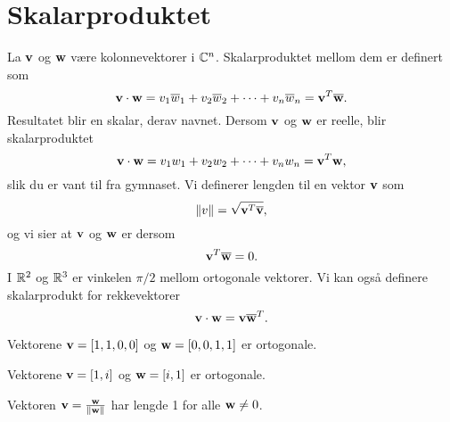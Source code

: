

\label{ch:projeksjon}
\section*{Skalarproduktet}
La $\mathbf{v}$ og $\mathbf{w}$ være kolonnevektorer i $\mathbb{C}^n$. 
Skalarproduktet mellom dem er definert som
\[
 \mathbf{v}\cdot  \mathbf{w} = v_1\overline w_1 + v_2\overline w_2 + \cdots +v_n\overline w_n=\mathbf{v}^T \overline{ \mathbf{w}}.
 \] 
Resultatet blir en skalar, derav navnet. 
Dersom $\mathbf{v}$ og $\mathbf{w}$ er reelle, blir skalarproduktet 
\[
 \mathbf{v}\cdot  \mathbf{w} = v_1w_1 + v_2w_2 + \cdots +v_nw_n=\mathbf{v}^T\mathbf{w},
 \] 
 slik du er vant til fra gymnaset.
 Vi definerer lengden til en vektor $\mathbf{v}$ som 
 \[
 \|v\|=\sqrt{\mathbf{v}^T\overline{\mathbf{v}}},
 \]
 og vi sier at $\mathbf{v}$ og $\mathbf{w}$ er  dersom 
\[
 \mathbf{v}^T  \overline{\mathbf{w}} = 0.
 \]
I $\mathbb{R}^2$ og $\mathbb{R}^3$ er vinkelen $\pi/2$ mellom ortogonale vektorer. 
Vi kan også definere skalarprodukt for rekkevektorer
 \[
 \mathbf{v}\cdot  \mathbf{w} =\mathbf{v}\overline{\mathbf{w}}^T.
 \] 

 \begin{ex}
 Vektorene $\mathbf{v}=[1,1,0,0]$ og $\mathbf{w}=[0,0,1,1]$ er ortogonale. 
 \end{ex}

 \begin{ex}
 Vektorene $\mathbf{v}=[1,i]$ og $\mathbf{w}=[i,1]$ er ortogonale. 
 \end{ex}

 \begin{ex}
 Vektoren $\mathbf{v}=\frac{\mathbf{w}}{\|\mathbf{w}\|}$ har lengde 1 for alle $\mathbf{w} \neq 0$.
 \end{ex}
 
